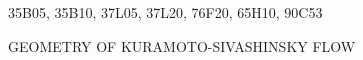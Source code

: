 \documentclass{siamltex}          %
\begin{document}
\begin{AMS}
35B05, 35B10, 37L05, 37L20, 76F20, 65H10, 90C53
\end{AMS}

\pagestyle{myheadings}
\thispagestyle{plain}
         {GEOMETRY OF  KURAMOTO-SIVASHINSKY FLOW}








\appendix





\end{document}
